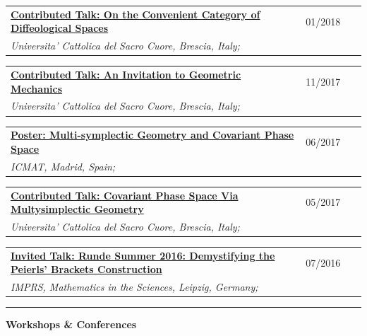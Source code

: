 \documentclass[a4paper]{article}
\newcommand{\block}[1]{\hrule \vspace{0.2cm} \textbf{\Large #1} \vspace{0.2cm}}
\newcommand{\longvoice}[8]{
	\begin{tabular}{p{0.83\linewidth} p{0.17\linewidth} }
		\textbf{\href{#3}{#2: #1}} & #4 
		\\ 
		\textit{#5, #6, #7;} & {\small\emph{#8}}
	\end{tabular}
	\vspace{.5em}
}
\begin{document}
	\longvoice{On the Convenient Category of Diffeological Spaces}
		{Contributed Talk}
		{https://www.dropbox.com/s/thm6unntpduynh3/1801-Talk-ConvenientDiffeological.pdf?dl=0}
		{01/2018}
		{Universita' Cattolica del Sacro Cuore}
		{Brescia}
		{Italy}
		{}
	\longvoice{An Invitation to Geometric Mechanics}
		{Contributed Talk}
		{https://www.dropbox.com/s/k066hn2ubovhaop/1711-talk-invitationGeoMec.pdf?dl=0}
		{11/2017}
		{Universita' Cattolica del Sacro Cuore}
		{Brescia}
		{Italy}
		{}
	\longvoice{Multi-symplectic Geometry and Covariant Phase Space}
		{Poster}
		{https://www.researchgate.net/publication/319301416_Multi-symplectic_Geometry_and_Covariant_Phase_Space}
		{06/2017}
		{ICMAT}
		{Madrid}
		{Spain}
		{}
	\longvoice{Covariant Phase Space Via Multysimplectic Geometry}
		{Contributed Talk}
		{https://www.researchgate.net/publication/319301194_Notes_on_Covariant_Phase_Space_via_MultiSymplectic_Geometry}
		{05/2017}
		{Universita' Cattolica del Sacro Cuore}
		{Brescia}
		{Italy}
		{}
	\longvoice{Runde Summer 2016: Demystifying the Peierls' Brackets Construction}
		{Invited Talk}
		{https://www.dropbox.com/s/slk28t877e2nxtq/1607-Liepzig-RundeSummer.PDF?dl=0}
		{07/2016}
		{IMPRS, Mathematics in the Sciences}
		{Leipzig}
		{Germany}
		{}


	\block{Workshops \& Conferences}
\end{document}
